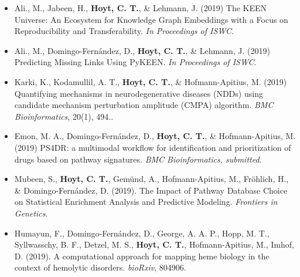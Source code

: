 \begin{itemize}
    \item Ali., M., Jabeen, H., \textbf{Hoyt, C. T.}, \& Lehmann, J. (2019) The KEEN Universe: An Ecosystem for Knowledge Graph Embeddings with a Focus on Reproducibility and Transferability. \textit{In Proceedings of ISWC}.
    \item Ali., M., Domingo-Fern\'{a}ndez, D., \textbf{Hoyt, C. T.}, \& Lehmann, J. (2019) Predicting Missing Links Using PyKEEN. \textit{In Proceedings of ISWC}.
    \item Karki, K., Kodamullil, A. T., \textbf{Hoyt, C. T.}, \& Hofmann-Apitius, M. (2019) Quantifying mechanisms in neurodegenerative diseases (NDDs) using candidate mechanism perturbation amplitude (CMPA) algorithm. \textit{BMC Bioinformatics}, 20(1), 494..
    \item Emon, M. A., Domingo-Fern\'{a}ndez, D., \textbf{Hoyt, C. T.}, \& Hofmann-Apitius, M. (2019) PS4DR: a multimodal workflow for identification and prioritization of drugs based on pathway signatures. \textit{BMC Bioinformatics, submitted}.
    \item Mubeen, S., \textbf{Hoyt, C. T.}, Gem\"{u}nd, A., Hofmann-Apitius, M., Fr\"{o}hlich, H., \& Domingo-Fern\'{a}ndez, D. (2019). The Impact of Pathway Database Choice on Statistical Enrichment Analysis and Predictive Modeling. \textit{Frontiers in Genetics}.
    \item Humayun, F., Domingo-Fernández, D., George, A. A. P., Hopp, M. T., Syllwasschy, B. F., Detzel, M. S., \textbf{Hoyt, C. T.}, Hofmann-Apitius, M., Imhof, D. (2019). A computational approach for mapping heme biology in the context of hemolytic disorders. \textit{bioRxiv}, 804906.
\end{itemize}
